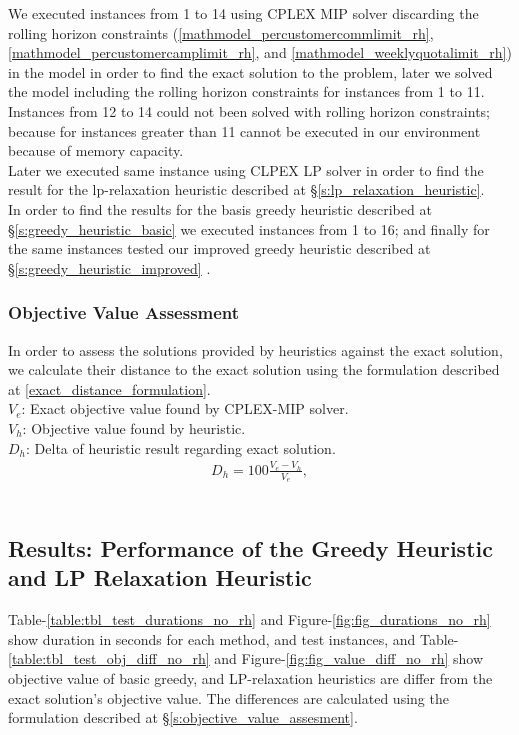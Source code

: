 \documentclass[11pt]{article}
\begin{document}
We executed instances from 1 to 14 using CPLEX MIP solver discarding the rolling horizon constraints (\ref{mathmodel_percustomercommlimit_rh}, \ref{mathmodel_percustomercamplimit_rh},  and \ref{mathmodel_weeklyquotalimit_rh}) in the model in order to find the exact solution to the problem, later we solved the model including the rolling horizon constraints for instances from 1 to 11. Instances from 12 to 14 could not been solved with rolling horizon constraints; because for instances greater than 11 cannot be executed in our environment because of memory capacity.\\
Later we executed same instance using CLPEX LP solver in order to find the result for the lp-relaxation heuristic described at \S \ref{s:lp_relaxation_heuristic}.\\
In order to find the results for the basis greedy heuristic described at \S \ref{s:greedy_heuristic_basic} we executed instances from 1 to 16; and finally for the same instances tested our improved greedy heuristic described at \S \ref{s:greedy_heuristic_improved} .
\subsubsection*{Objective Value Assessment} \label{s:objective_value_assesment}
In order to assess the solutions provided by heuristics against the exact solution, we calculate their distance to the exact solution using the formulation described at \equationautorefname \eqref{exact_distance_formulation}.\\

\noindent $V_{e}$: Exact objective value found by CPLEX-MIP solver. \\
\noindent $V_{h}$: Objective value found by heuristic. \\
\noindent $D_{h}$: Delta of heuristic result regarding exact solution. \\
\begin{align}
&D_{h} = 100 \frac{V_{e} - V_{h}}{V_{e}}, \label{exact_distance_formulation}&
\end{align}\\

\subsection{Results: Performance of the Greedy Heuristic and LP Relaxation Heuristic} \label{test_evaluation}
Table-\ref{table:tbl_test_durations_no_rh} and Figure-\ref{fig:fig_durations_no_rh} show duration in seconds for each method, and test instances, and Table-\ref{table:tbl_test_obj_diff_no_rh} and Figure-\ref{fig:fig_value_diff_no_rh} show  objective value of basic greedy, and LP-relaxation heuristics are differ from the exact solution's objective value. The differences are calculated using the formulation described at \S \ref{s:objective_value_assesment}.\\
\end{document}
